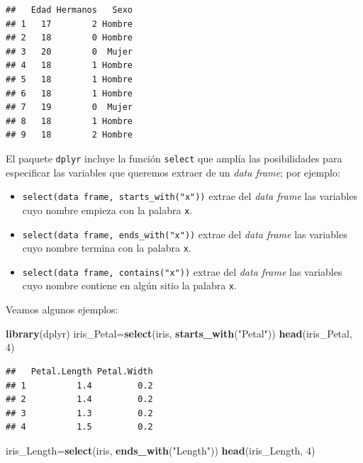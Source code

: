 \documentclass[]{book}
\newenvironment{Shaded}{\begin{snugshade}}{\end{snugshade}}
\newcommand{\DecValTok}[1]{\textcolor[rgb]{0.00,0.00,0.81}{#1}}
\newcommand{\KeywordTok}[1]{\textcolor[rgb]{0.13,0.29,0.53}{\textbf{#1}}}
\newcommand{\NormalTok}[1]{#1}
\newcommand{\StringTok}[1]{\textcolor[rgb]{0.31,0.60,0.02}{#1}}
\providecommand{\tightlist}{%
  \setlength{\itemsep}{0pt}\setlength{\parskip}{0pt}}
\theoremstyle{definition}
\theoremstyle{definition}
\theoremstyle{definition}
\theoremstyle{remark}
\begin{document}
\begin{verbatim}
##   Edad Hermanos   Sexo
## 1   17        2 Hombre
## 2   18        0 Hombre
## 3   20        0  Mujer
## 4   18        1 Hombre
## 5   18        1 Hombre
## 6   18        1 Hombre
## 7   19        0  Mujer
## 8   18        1 Hombre
## 9   18        2 Hombre
\end{verbatim}

El paquete \texttt{dplyr} incluye la función \texttt{select} que amplía las posibilidades para especificar las variables que queremos extraer de un \emph{data frame}; por ejemplo:

\begin{itemize}
\tightlist
\item
  \texttt{select(data\ frame,\ starts\_with("x"))} extrae del \emph{data frame} las variables cuyo nombre empieza con la palabra \texttt{x}.
\item
  \texttt{select(data\ frame,\ ends\_with("x"))} extrae del \emph{data frame} las variables cuyo nombre termina con la palabra \texttt{x}.
\item
  \texttt{select(data\ frame,\ contains("x"))} extrae del \emph{data frame} las variables cuyo nombre contiene en algún sitio la palabra \texttt{x}.
\end{itemize}

Veamos algunos ejemplos:

\begin{Shaded}
\begin{Highlighting}[]
\KeywordTok{library}\NormalTok{(dplyr)}
\NormalTok{iris_Petal=}\KeywordTok{select}\NormalTok{(iris, }\KeywordTok{starts_with}\NormalTok{(}\StringTok{"Petal"}\NormalTok{)) }
\KeywordTok{head}\NormalTok{(iris_Petal, }\DecValTok{4}\NormalTok{)}
\end{Highlighting}
\end{Shaded}

\begin{verbatim}
##   Petal.Length Petal.Width
## 1          1.4         0.2
## 2          1.4         0.2
## 3          1.3         0.2
## 4          1.5         0.2
\end{verbatim}

\begin{Shaded}
\begin{Highlighting}[]
\NormalTok{iris_Length=}\KeywordTok{select}\NormalTok{(iris, }\KeywordTok{ends_with}\NormalTok{(}\StringTok{"Length"}\NormalTok{))}
\KeywordTok{head}\NormalTok{(iris_Length, }\DecValTok{4}\NormalTok{)}
\end{Highlighting}
\end{Shaded}
\end{document}
